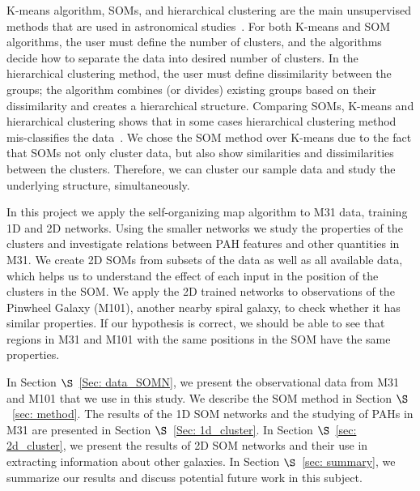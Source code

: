 K-means algorithm, SOMs, and hierarchical clustering are the main unsupervised methods that are used in astronomical studies~\citep[e.g.][]{DAbrusco12, Aycha16}. %
For both K-means and SOM algorithms, the user must define the number of clusters, and the algorithms decide how to separate the data into desired number of clusters.
In the hierarchical clustering method, the user must define dissimilarity between the groups; the algorithm combines (or divides) existing groups based on their dissimilarity and creates a hierarchical structure. 
Comparing SOMs, K-means and hierarchical clustering shows that in some cases hierarchical clustering method mis-classifies the data~\citep[][and references therein]{Mangiameli96}.
We chose the SOM method over K-means due to the fact that SOMs not only cluster data, but also show similarities and dissimilarities between the clusters.
Therefore, we can cluster our sample data and study the underlying structure, simultaneously.

In this project we apply the self-organizing map algorithm to M31 data, training 1D and 2D networks.
Using the smaller networks we study the properties of the clusters and investigate relations between PAH features and other quantities in M31.
We create 2D SOMs from subsets of the data as well as all available data, which helps us to understand the effect of each input in the position of the clusters in the SOM. %
We apply the 2D trained networks to  observations of the Pinwheel Galaxy (M101), another nearby spiral  galaxy, to check whether it has similar properties.
If our hypothesis is correct, we should be able to see that regions in M31 and M101 with the same positions in the SOM have the same properties.

In Section $\S$~\ref{Sec: data_SOMN}, we present the observational data from M31 and M101 that we use in this study. 
We describe the SOM method in Section $\S$~\ref{sec: method}. 
The results of the 1D SOM networks and the studying of PAHs in M31 are presented in Section $\S$~\ref{Sec: 1d_cluster}.
In Section $\S$~\ref{sec: 2d_cluster}, we present the results of 2D SOM networks and their use in extracting information about other galaxies.
In Section $\S$~\ref{sec: summary}, we summarize our results and discuss potential future work in this subject.










